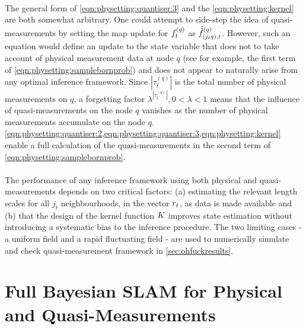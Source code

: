 \\ The general form of \cref{eqn:physetting:quantiser:3} and the \cref{eqn:physetting:kernel} are both somewhat arbitrary. One could attempt to side-step the idea of quasi-measurements by setting the map update for $f^{( q )}_{t}$ as $\hat{\hat{f}}^{(q)}_{(j_tq),t}$. However, such an equation would define an update to the state variable that does not to take account of physical measurement data at node $q$ (see for example, the first term of \cref{eqn:physetting:samplebornprob}) and does not appear to naturally arise from any optimal inference framework. Since $|\tau^{(q)}_t|$ is the total number of physical measurements on $q$,  a forgetting factor $\lambda^{|\tau^{(q)}_t|}, 0 < \lambda < 1$ means that the influence of quasi-measurements on the node $q$ vanishes as the number of physical measurements accumulate on the node $q$. \cref{eqn:physetting:quantiser:2,eqn:physetting:quantiser:3,eqn:physetting:kernel} enable a full calculation of the quasi-measurements in the second term of \cref{eqn:physetting:samplebornprob}. \\ %
\\
The performance of any inference framework using both physical and quasi-measurements depends on two critical factors: (a) estimating the relevant length scales for all $j_t$ neighbourhoods, in the vector $r_{ t}$, as data is made available and (b) that the design of the kernel function $K$ improves state estimation without introducing a systematic bias to the inference procedure. The two limiting cases - a uniform field and a rapid fluctuating field - are used to numerically simulate and check quasi-measurement framework in \cref{sec:ohfuckresults}.  

\section{Full Bayesian SLAM for Physical and Quasi-Measurements}
 
